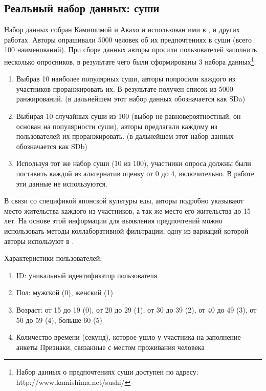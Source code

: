 	\subsection{Реальный набор данных: суши}
		Набор данных собран Камишимой и Акахо и использован ими в \cite{Kamishima:2003}, \cite{Kamishima:2006} и других работах. Авторы опрашивали 5000 человек об их предпочтениях в суши (всего 100 наименований). При сборе данных авторы просили пользователей заполнить несколько опросников, в результате чего были сформированы 3 набора данных\footnote{Набор данных о предпочтениях суши доступен по адресу: http://www.kamishima.net/sushi/}:
		\begin{enumerate}[itemsep=-1.5mm]
			\item Выбрав 10 наиболее популярных суши, авторы попросили каждого из участников проранжировать их. В результате получен список из 5000 ранжирований. (в дальнейшем этот набор данных обозначается как SDa)
			\item Выбирая 10 случайных суши из 100 (выбор не равновероятностный, он основан на популярности суши), авторы предлагали каждому из пользователей их проранжировать. (в дальнейшем этот набор данных обозначается как SDb)
			\item Используя тот же набор суши (10 из 100), участники опроса должны были поставить каждой из альтернатив оценку от 0 до 4, включительно. В работе эти данные не используются.
		\end{enumerate}
		
		В связи со спецификой японской культуры еды, авторы подробно указывают место жительства каждого из участников, а так же место его жительства до 15 лет. На основе этой информации для выявления предпочтений можно использовать методы коллаборативной фильтрации\cite{Ricci:2011}, одну из вариаций которой авторы используют в \cite{Kamishima:2003}.
		
		\vspace{1em}
		
		\noindent Характеристики пользователей:
		\vspace{-0.7em}
		\begin{enumerate}[itemsep=-1.5mm]
			\item ID: уникальный идентификатор пользователя
			\item Пол: мужской (0), женский (1)
			\item Возраст: от 15 до 19 (0), от 20 до 29 (1), от 30 до 39 (2), от 40 до 49 (3), от 50 до 59 (4), больше 60 (5)
			\item Количество времени (секунд), которое ушло у участника на заполнение анкеты
			 Признаки, связанные с местом проживания человека
		\end{enumerate}
		
